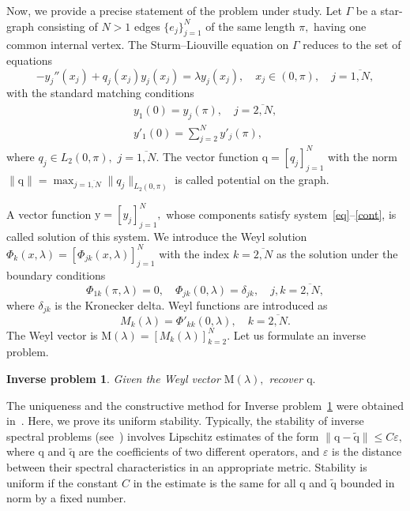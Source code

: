\documentclass[a4paper, 12pt] {article}
\theoremstyle{plain}
\newtheorem{IP}{\indent Inverse problem}
\theoremstyle{remark}
\theoremstyle{plain}
\theoremstyle{definition}
\numberwithin{equation}{section}
\begin{document}
Now, we provide a precise statement of the problem under study. Let $\Gamma$
be a star-graph consisting of $N>1$ edges $\{ e_j \}_{j=1}^N$ of the same length $\pi,$
having one common internal vertex.
The Sturm--Liouville equation on $\Gamma$ reduces to the set of equations
\begin{equation} \label{eq}
-y_j''(x_j) + q_j(x_j) y_j(x_j) = \lambda y_j(x_j), \quad x_j \in (0, \pi),
\quad j = \overline{1, N},
\end{equation}
with the standard matching conditions
\begin{equation} \label{cont}
\begin{split}
y_1(0) = y_j(\pi), \quad j = \overline{2, N},
\\
y'_1(0) = \sum_{j=2}^N y'_j(\pi),
\end{split}
\end{equation}
where $q_j \in L_2(0, \pi),$ $j=\overline{1, N}.$
The vector function $\mathrm{q} = [q_j ]_{j=1}^N$ with the norm
$\| \mathrm{q} \| = \max_{j=\overline{1, N}} \|q_j\|_{L_2(0, \pi)}$ is called potential on the graph.

A vector function $\mathrm{y} = [y_j]_{j=1}^N,$ whose components satisfy system~\eqref{eq}--\eqref{cont}, is called solution of this system.
We introduce the Weyl solution $\Phi_k(x, \lambda) = [ \Phi_{jk}(x, \lambda)]_{j=1}^N$ with the index $k=\overline{2, N}$ as the solution
under the boundary conditions
\begin{equation} \label{Weyl bc}
\Phi_{1k}(\pi, \lambda) = 0, \quad \Phi_{jk}(0, \lambda) = \delta_{jk}, \quad j, k=\overline{2, N},
\end{equation}
where $\delta_{jk}$ is the Kronecker delta. Weyl functions are introduced as
$$M_k(\lambda) = \Phi'_{kk}(0, \lambda), \quad k=\overline{2, N}.$$
The Weyl vector is ${\mathrm M}(\lambda) = [M_k(\lambda)]_{k=2}^N.$
Let us formulate an inverse problem.
\begin{IP} \label{main ip}
Given the Weyl vector ${\mathrm M}(\lambda),$ recover $\mathrm{q}.$
\end{IP}
The uniqueness and the constructive method for Inverse problem~\ref{main ip} were obtained in~\cite{yurko2005}.
Here, we prove its uniform stability. Typically, the stability of inverse spectral problems (see~\cite{freil,sav,borg-compl,sav2}) involves Lipschitz estimates of the form $\| \mathrm{q} - \tilde{\mathrm q}\| \le C\varepsilon,$ where $\mathrm{q}$ and $\tilde{\mathrm q}$ are the coefficients of two different operators, and
$\varepsilon$ is the distance between their spectral characteristics in an appropriate metric. Stability is uniform if the constant $C$ in the estimate is the same for all $\mathrm{q}$ and $\tilde{\mathrm q}$ bounded in norm by a fixed number.
\end{document}

